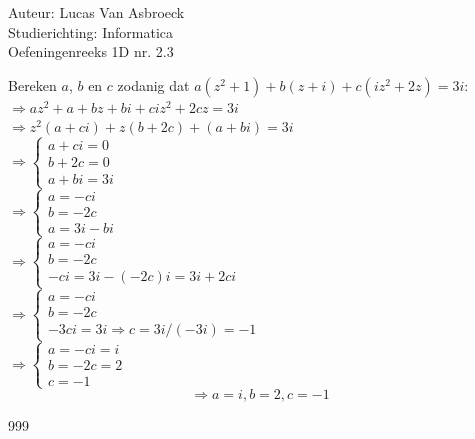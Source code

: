 \documentclass[a4paper]{article}
\begin{document}
\noindent \large Auteur: Lucas Van Asbroeck \\
\noindent \large Studierichting: Informatica\\
\noindent \large Oefeningenreeks 1D nr. 2.3\\

\medskip

\normalsize

Bereken $a$, $b$ en $c$ zodanig dat $a(z^2+1)+b(z+i)+c(iz^2+2z) = 3i$:\\

$\Rightarrow az^2 + a + bz + bi + ciz^2 + 2cz = 3i$\\

$\Rightarrow z^2(a+ci) + z(b+2c) + (a + bi) = 3i$\\

$\Rightarrow \left\{ \begin{array}{l}
	a + ci = 0\\
	b + 2c = 0\\
	a + bi = 3i
\end{array} \right. $\\

$\Rightarrow \left\{ \begin{array}{l}
	a = -ci \\
	b = -2c \\
	a = 3i - bi
\end{array} \right. $\\

$\Rightarrow \left\{ \begin{array}{l}
	a = -ci \\
	b = -2c \\
	-ci = 3i - (-2c)i = 3i + 2ci
\end{array} \right. $\\

$\Rightarrow \left\{ \begin{array}{l}
	a = -ci \\
	b = -2c \\
	-3ci = 3i \Rightarrow c = 3i/(-3i) = -1
\end{array} \right. $\\

$\Rightarrow \left\{ \begin{array}{l}
	a = -ci = i \\
	b = -2c = 2 \\
	c = -1
\end{array} \right. $\\

$$\Rightarrow \boxed{ a=i, b=2, c=-1}$$

\begin{thebibliography}{999}
\end{thebibliography}
\end{document}
